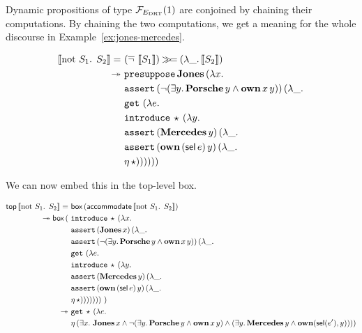 Dynamic propositions of type $\mathcal{F}_{E_{\mathrm{DRT}}}(1)$ are conjoined by chaining
their computations. By chaining the two computations, we get a meaning for
the whole discourse in Example~\ref{ex:jones-mercedes}.

\begin{align*}
  \sem{\text{not $S_1$. $S_2$}} = &\ (\dnot\ \sem{S_1}) \hsbind (\lam{\_}{\sem{S_2}}) \\
\tto &\ \app{\op{presuppose}}{\obj{Jones}}{(\lam{x}{ \\
     &\ \app{\op{assert}}{(\lnot (\exists y.\, \ap{\obj{Porsche}}{y} \land \app{\obj{own}}{x}{y}))}{(\lam{\_}{ \\
     &\ \app{\op{get}}{}{(\lam{e}{ \\
     &\ \app{\op{introduce}}{\star}{(\lam{y}{ \\
     &\ \app{\op{assert}}{(\ap{\obj{Mercedes}}{y})}{(\lam{\_}{ \\
     &\ \app{\op{assert}}{(\app{\obj{own}}{(\ap{\sel}{e})}{y})}{(\lam{\_}{ \\
     &\ \etaE{\star}})}})}})}})}})}})}
\end{align*}

We can now embed this in the top-level box.

\begin{align*}
  \ap{\TOP}{\sem{\text{not $S_1$. $S_2$}}} = &\ \ap{\BOX}{(\ap{\accommodate}{\sem{\text{not $S_1$. $S_2$}}})} \\
\tto \ap{\BOX}{(
     &\ \app{\op{introduce}}{\star}{(\lam{x}{ \\
     &\ \app{\op{assert}}{(\ap{\obj{Jones}}{x})}{(\lam{\_}{ \\
     &\ \app{\op{assert}}{(\lnot (\exists y.\, \ap{\obj{Porsche}}{y} \land \app{\obj{own}}{x}{y}))}{(\lam{\_}{ \\
     &\ \app{\op{get}}{}{(\lam{e}{ \\
     &\ \app{\op{introduce}}{\star}{(\lam{y}{ \\
     &\ \app{\op{assert}}{(\ap{\obj{Mercedes}}{y})}{(\lam{\_}{ \\
     &\ \app{\op{assert}}{(\app{\obj{own}}{(\ap{\sel}{e})}{y})}{(\lam{\_}{ \\
     &\ \etaE{\star}})}})}})}})}})}})}})}\ )} \\
\tto &\ \app{\op{get}}{\star}{(\lam{e}{ \\
     &\ \etaE{(\exists x.\
          \ap{\obj{Jones}}{x} \land
          \lnot (\exists y.\, \ap{\obj{Porsche}}{y} \land \app{\obj{own}}{x}{y}) \land
          (\exists y.\, \ap{\obj{Mercedes}}{y} \land \obj{own}(\sel(e'), y)))}})}
\end{align*}


